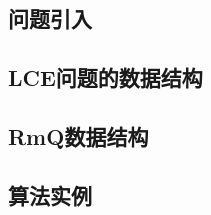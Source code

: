 \subsection{问题引入}\label{subsec:intro}


\subsection{LCE问题的数据结构}\label{subsec:lce}

\subsection{RmQ数据结构}\label{subsec:rmq}

\subsection{算法实例}\label{subsec:eg}
